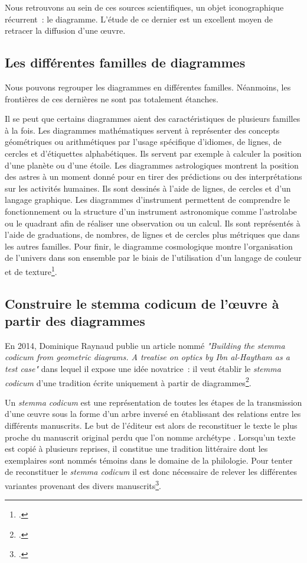 Nous retrouvons au sein de ces sources scientifiques, un objet iconographique récurrent~: le diagramme.
L'étude de ce dernier est un excellent moyen de retracer la diffusion d'une œuvre.

\subsection{Les différentes familles de diagrammes}
Nous pouvons regrouper les diagrammes en différentes familles.
Néanmoins, les frontières de ces dernières ne sont pas totalement étanches.

Il se peut que certains diagrammes aient des caractéristiques de plusieurs familles à la fois.
Les diagrammes mathématiques servent à représenter des concepts géométriques ou arithmétiques par l'usage spécifique d'idiomes, de lignes, de cercles et d'étiquettes alphabétiques.
Ils servent par exemple à calculer la position d'une planète ou d'une étoile.
Les diagrammes astrologiques montrent la position des astres à un moment donné pour en tirer des prédictions ou des interprétations sur les activités humaines.
Ils sont dessinés à l'aide de lignes, de cercles et d'un langage graphique.
Les diagrammes d'instrument permettent de comprendre le fonctionnement ou la structure d'un instrument astronomique comme l'astrolabe ou le quadrant afin de réaliser une observation ou un calcul.
Ils sont représentés à l'aide de graduations, de nombres, de lignes et de cercles plus métriques que dans les autres familles.
Pour finir, le diagramme cosmologique montre l'organisation de l'univers dans son ensemble par le biais de l'utilisation d'un langage de couleur et de texture\footcite{Conference2025Long2025}.

\subsection{Construire le stemma codicum de l'œuvre à partir des diagrammes}

En 2014, Dominique Raynaud publie un article nommé \textit{"Building the stemma codicum from geometric diagrams. A treatise on optics by Ibn al-Haytham as a test case"}
dans lequel il expose une idée novatrice~: il veut établir le \textit{stemma codicum} d'une tradition écrite uniquement à partir de diagrammes\footcite{raynaudBuildingStemmaCodicum2014}.

Un \textit{stemma codicum} est une représentation de toutes les étapes de la transmission d'une œuvre sous la forme d'un arbre inversé en établissant des relations entre les différents manuscrits.
Le but de l'éditeur est alors de reconstituer le texte le plus proche du manuscrit original perdu que l'on nomme \og archétype \fg.
Lorsqu'un texte est copié à plusieurs reprises, il constitue une \og tradition littéraire \fg dont les exemplaires sont nommés \og témoins \fg dans le domaine de la philologie.
Pour tenter de reconstituer le \textit{stemma codicum} il est donc nécessaire de relever les différentes variantes provenant des divers manuscrits\footcite{pouliquenUsingLatticesReconstructing}.

